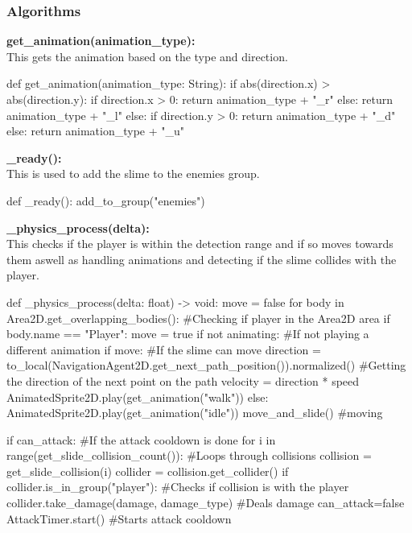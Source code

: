\documentclass{article}
\begin{document}
        \subsubsection{Algorithms}
        \textbf{get\_animation(animation\_type):}\\
        This gets the animation based on the type and direction.\\
        \begin{python}
def get_animation(animation_type: String):
	if abs(direction.x) > abs(direction.y):
		if direction.x > 0:
			return animation_type + "_r"
		else:
			return animation_type + "_l"
	else:
		if direction.y > 0:
			return animation_type + "_d"
		else:
			return animation_type + "_u"
        \end{python}
        \textbf{\_ready():}\\
        This is used to add the slime to the enemies group.\\
        \begin{python}
def _ready():
   add_to_group("enemies")
        \end{python}
        \textbf{\_physics\_process(delta):}\\
        This checks if the player is within the detection range and if so moves towards them aswell as handling animations and detecting if the slime collides with the player.\\
        \begin{python}
def _physics_process(delta: float) -> void:
   move = false
   for body in Area2D.get_overlapping_bodies(): #Checking if player in the Area2D area
      if body.name == "Player":
         move = true
   if not animating: #If not playing a different animation
      if move: #If the slime can move
         direction = to_local(NavigationAgent2D.get_next_path_position()).normalized() #Getting the direction of the next point on the path
         velocity = direction * speed
         AnimatedSprite2D.play(get_animation("walk"))
      else:
         AnimatedSprite2D.play(get_animation("idle"))
   move_and_slide() #moving
                
   if can_attack: #If the attack cooldown is done
      for i in range(get_slide_collision_count()): #Loops through collisions
         collision = get_slide_collision(i)
         collider = collision.get_collider()
            if collider.is_in_group("player"): #Checks if collision is with the player
               collider.take_damage(damage, damage_type) #Deals damage
               can_attack=false 
               AttackTimer.start() #Starts attack cooldown
        \end{python}
\end{document}
